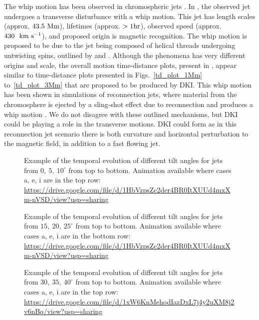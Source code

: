 The whip motion has been observed in chromospheric jets \citep{Liu2009ApJ707L37L}. In \cite{Liu2009ApJ707L37L}, the observed jet undergoes a transverse disturbance with a whip motion. This jet has length scales (approx. $43.5~\rm{Mm}$), lifetimes (approx. $>1\rm{hr}$), observed speed (approx. $430~~\rm{km ~s^{-1}}$), and proposed origin is magnetic recognition. The whip motion is proposed to be due to the jet being composed of helical threads undergoing untwisting spins, outlined by \cite{Shibata1985PASJ3731S, Shibata1986SoPh103299S} and \cite{Canfield1996ApJ4641016C}. Although the phenomena has very different origins and scale, the overall motion time-distance plots, present in \cite{Liu2009ApJ707L37L}, appear similar to time-distance plots presented in Figs.~\ref{td_plot_1Mm} to~\ref{td_plot_3Mm} that are proposed to be produced by DKI. This whip motion has been shown in simulations of reconnection jets, where material from the chromosphere is ejected by a sling-shot effect due to reconnection and produces a whip motion \citep{Yokoyama1996PASJ48353Y, Kotani2020PASJ7275K}. We do not disagree with these outlined mechanisms, but DKI could be playing a role in the transverse motions. DKI could form as in this reconnection jet scenario there is both curvature and horizontal perturbation to the magnetic field, in addition to a fast flowing jet. \np
\begin{figure}
\captionsetup[subfigure]{labelformat=empty}
\centering
{}
\caption{Example of the temporal evolution of different tilt angles for jets from $0,~5,~10^{\circ}$ from top to bottom. Animation available where cases a, e, i are in the top row: \url{https://drive.google.com/file/d/1HbVzpsZc2der4BR0ItXUUd4mxXm-nVSD/view?usp=sharing} }
\label{tj_morph_1}
\end{figure}
\begin{figure}
\captionsetup[subfigure]{labelformat=empty}
\centering
{}
\caption{Example of the temporal evolution of different tilt angles for jets from $15,~20,~25^{\circ}$ from top to bottom. Animation available where cases a, e, i are in the bottom row: \url{https://drive.google.com/file/d/1HbVzpsZc2der4BR0ItXUUd4mxXm-nVSD/view?usp=sharing}}
\label{tj_morph_2}
\end{figure}
\begin{figure}
\captionsetup[subfigure]{labelformat=empty}
\centering
{}
\caption{Example of the temporal evolution of different tilt angles for jets from $30,~35,~40^{\circ}$ from top to bottom. Animation available where cases a, e, i are in the top row: \url{https://drive.google.com/file/d/1xW6KnMehodIazDxL7j4y2uXM8j2v6nBq/view?usp=sharing}}
\label{tj_morph_3}
\end{figure}
